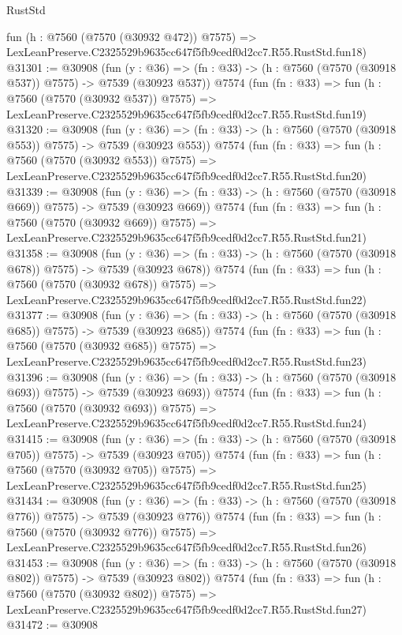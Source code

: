 \begin{lexlean}{RustStd}
\begin{coremodule}
    fun (h : @7560 (@7570 (@30932 @472)) @7575) =>
    LexLeanPreserve.C2325529b9635cc647f5fb9cedf0d2cc7.R55.RustStd.fun18)
@31301 := @30908
    (fun (y : @36) => (fn : @33) -> (h : @7560 (@7570 (@30918 @537)) @7575) -> @7539 (@30923 @537))
    @7574
    (fun (fn : @33) =>
    fun (h : @7560 (@7570 (@30932 @537)) @7575) =>
    LexLeanPreserve.C2325529b9635cc647f5fb9cedf0d2cc7.R55.RustStd.fun19)
@31320 := @30908
    (fun (y : @36) => (fn : @33) -> (h : @7560 (@7570 (@30918 @553)) @7575) -> @7539 (@30923 @553))
    @7574
    (fun (fn : @33) =>
    fun (h : @7560 (@7570 (@30932 @553)) @7575) =>
    LexLeanPreserve.C2325529b9635cc647f5fb9cedf0d2cc7.R55.RustStd.fun20)
@31339 := @30908
    (fun (y : @36) => (fn : @33) -> (h : @7560 (@7570 (@30918 @669)) @7575) -> @7539 (@30923 @669))
    @7574
    (fun (fn : @33) =>
    fun (h : @7560 (@7570 (@30932 @669)) @7575) =>
    LexLeanPreserve.C2325529b9635cc647f5fb9cedf0d2cc7.R55.RustStd.fun21)
@31358 := @30908
    (fun (y : @36) => (fn : @33) -> (h : @7560 (@7570 (@30918 @678)) @7575) -> @7539 (@30923 @678))
    @7574
    (fun (fn : @33) =>
    fun (h : @7560 (@7570 (@30932 @678)) @7575) =>
    LexLeanPreserve.C2325529b9635cc647f5fb9cedf0d2cc7.R55.RustStd.fun22)
@31377 := @30908
    (fun (y : @36) => (fn : @33) -> (h : @7560 (@7570 (@30918 @685)) @7575) -> @7539 (@30923 @685))
    @7574
    (fun (fn : @33) =>
    fun (h : @7560 (@7570 (@30932 @685)) @7575) =>
    LexLeanPreserve.C2325529b9635cc647f5fb9cedf0d2cc7.R55.RustStd.fun23)
@31396 := @30908
    (fun (y : @36) => (fn : @33) -> (h : @7560 (@7570 (@30918 @693)) @7575) -> @7539 (@30923 @693))
    @7574
    (fun (fn : @33) =>
    fun (h : @7560 (@7570 (@30932 @693)) @7575) =>
    LexLeanPreserve.C2325529b9635cc647f5fb9cedf0d2cc7.R55.RustStd.fun24)
@31415 := @30908
    (fun (y : @36) => (fn : @33) -> (h : @7560 (@7570 (@30918 @705)) @7575) -> @7539 (@30923 @705))
    @7574
    (fun (fn : @33) =>
    fun (h : @7560 (@7570 (@30932 @705)) @7575) =>
    LexLeanPreserve.C2325529b9635cc647f5fb9cedf0d2cc7.R55.RustStd.fun25)
@31434 := @30908
    (fun (y : @36) => (fn : @33) -> (h : @7560 (@7570 (@30918 @776)) @7575) -> @7539 (@30923 @776))
    @7574
    (fun (fn : @33) =>
    fun (h : @7560 (@7570 (@30932 @776)) @7575) =>
    LexLeanPreserve.C2325529b9635cc647f5fb9cedf0d2cc7.R55.RustStd.fun26)
@31453 := @30908
    (fun (y : @36) => (fn : @33) -> (h : @7560 (@7570 (@30918 @802)) @7575) -> @7539 (@30923 @802))
    @7574
    (fun (fn : @33) =>
    fun (h : @7560 (@7570 (@30932 @802)) @7575) =>
    LexLeanPreserve.C2325529b9635cc647f5fb9cedf0d2cc7.R55.RustStd.fun27)
@31472 := @30908

\end{coremodule}
\end{lexlean}
